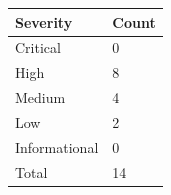\documentclass{article}
\begin{document}
                \begin{minipage}{.40\textwidth}
                \renewcommand{\arraystretch}{1.63}
                \begin{tabular}{|p{11em}|>{\centering\arraybackslash}p{6em}|}
                \hline
                \normalsize \cellcolor{black!10} \textbf{Severity} & \normalsize \cellcolor{black!10} \textbf{Count} \\
                 \hline
                 \normalsize Critical &   \normalsize \cellcolor{critical} 0  \\
                 \hline
                 \normalsize High & \normalsize \cellcolor{high} 8 \\
                 \hline
                 \normalsize Medium & \normalsize \cellcolor{medium} 4 \\
                 \hline
                 \normalsize Low & \normalsize \cellcolor{low} 2 \\
                 \hline
                 \normalsize Informational & \normalsize \cellcolor{info} 0 \\
                 \hline
                 \normalsize Total & \normalsize \cellcolor{total} 14 \\
                 \hline    
                \end{tabular}
                \end{minipage}

 

            \newpage
\end{document}
